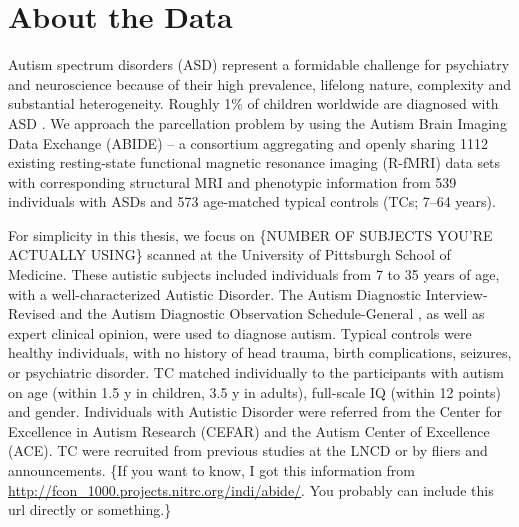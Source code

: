 \section{About the Data}
{\color{blue}

Autism spectrum disorders (ASD) represent a formidable challenge for
psychiatry and neuroscience because of their high prevalence, lifelong
nature, complexity and substantial heterogeneity. Roughly 1\% of
children worldwide are diagnosed with ASD \cite{centers2010autism}.
We approach the parcellation problem by using the Autism Brain Imaging
Data Exchange (ABIDE) -- a consortium aggregating and openly sharing
1112 existing resting-state functional magnetic resonance imaging
(R-fMRI) data sets with corresponding structural MRI and phenotypic
information from 539 individuals with ASDs and 573 age-matched typical
controls (TCs; 7–64 years).

For simplicity in this thesis, we focus on
\{NUMBER OF SUBJECTS YOU'RE ACTUALLY USING\}
scanned at the University of Pittsburgh School of Medicine.
These autistic subjects included individuals from 7 to 35 years of age,
with a well-characterized Autistic Disorder. The Autism Diagnostic
Interview-Revised \cite{lord1994autism} and the Autism Diagnostic
Observation Schedule-General \cite{lord2000autism}, as well as expert
clinical opinion, were used to diagnose autism. Typical controls were
healthy individuals, with no history of head trauma, birth
complications, seizures, or psychiatric disorder. TC matched
individually to the participants with autism on age (within 1.5 y in
children, 3.5 y in adults), full-scale IQ (within 12 points) and gender.
Individuals with Autistic Disorder were referred from the Center for
Excellence in Autism Research (CEFAR) and the Autism Center of
Excellence (ACE). TC were recruited from previous studies at the LNCD or
by fliers and announcements.
\{If you want to know, I got this information from
\url{http://fcon_1000.projects.nitrc.org/indi/abide/}.
You probably can include this url directly or something.\}

}
